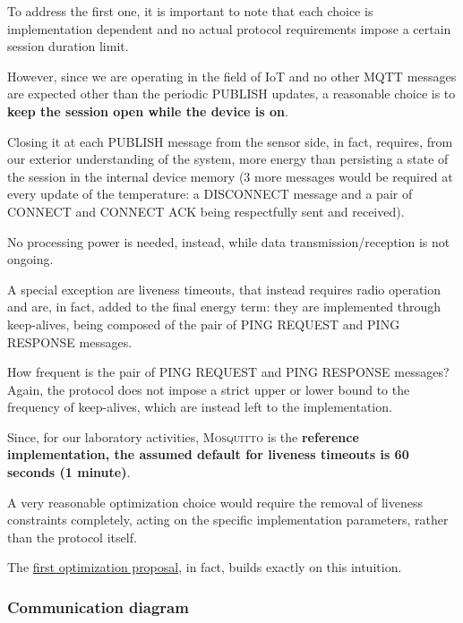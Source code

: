 \documentclass[a4paper,11pt]{article} %
\begin{document}
    \smallskip

    To address the first one, it is important to note that each choice is implementation dependent and no actual protocol requirements impose a certain session duration limit.

    However, since we are operating in the field of IoT and no other MQTT messages are expected other than the periodic \textsc{PUBLISH} updates, a reasonable choice is to \textbf{keep the session open while the device is on}.

    Closing it at each \textsc{PUBLISH} message from the sensor side, in fact, requires, from our exterior understanding of the system, more energy than persisting a state of the session in the internal device memory (3 more messages would be required at every update of the temperature: a \textsc{DISCONNECT} message and a pair of \textsc{CONNECT} and \textsc{CONNECT ACK} being respectfully sent and received).

    \smallskip

    No processing power is needed, instead, while data transmission/reception is not ongoing.

    \smallskip

    A special exception are liveness timeouts, that instead requires radio operation and are, in fact, added to the final energy term: they are implemented through keep-alives, being composed of the pair of \textsc{PING REQUEST} and \textsc{PING RESPONSE} messages.

    How frequent is the pair of \textsc{PING REQUEST} and \textsc{PING RESPONSE} messages?
    Again, the protocol does not impose a strict upper or lower bound to the frequency of keep-alives, which are instead left to the implementation.

    Since, for our laboratory activities, \textsc{Mosquitto} is the \textbf{reference implementation, the assumed default for liveness timeouts is 60 seconds (1 minute)}.

    A very reasonable optimization choice would require the removal of liveness constraints completely, acting on the specific implementation parameters, rather than the protocol itself.

    The \hyperref[subsubsec:deletion-liveness]{first optimization proposal}, in fact, builds exactly on this intuition.

    \subsubsection{Communication diagram}
\end{document}
